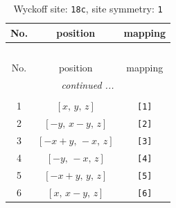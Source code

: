 \documentclass[fleqn,8pt]{jsarticle}
\begin{document}
\renewcommand{\arraystretch}{1.2}
\begin{longtable}{ccc}
\caption{Wyckoff site: {\tt 18c}, site symmetry: {\tt 1}}
 \\
 \hline \hline
No. & position & mapping \\ \hline \endfirsthead

\multicolumn{2}{l}{\tablename\ \thetable{}} \\
 \hline \hline
No. & position & mapping \\ \hline \endhead

 \hline \hline
\multicolumn{2}{r}{\footnotesize\it continued ...} \\ \endfoot

 \hline \hline
\multicolumn{2}{r}{} \\ \endlastfoot

1 & $\left[ x,\, y,\, z \right]$ & {\tt [1]} \\ \hline
2 & $\left[ - y,\, x - y,\, z \right]$ & {\tt [2]} \\ \hline
3 & $\left[ - x + y,\, - x,\, z \right]$ & {\tt [3]} \\ \hline
4 & $\left[ - y,\, - x,\, z \right]$ & {\tt [4]} \\ \hline
5 & $\left[ - x + y,\, y,\, z \right]$ & {\tt [5]} \\ \hline
6 & $\left[ x,\, x - y,\, z \right]$ & {\tt [6]} \\
\end{longtable}
\end{document}
